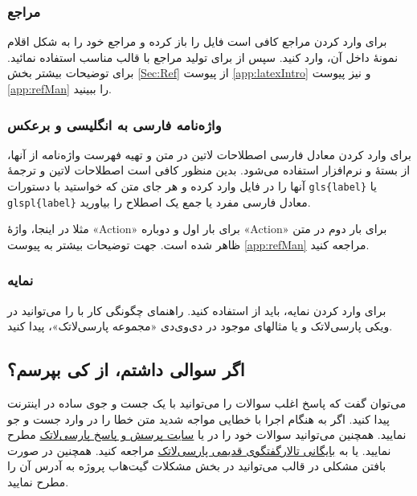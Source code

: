 	\subsubsection{مراجع}
	برای وارد کردن مراجع \پ کافی است فایل 
	را باز کرده و مراجع خود را به شکل اقلام نمونهٔ داخل آن، وارد کنید.  سپس از  برای تولید مراجع با قالب مناسب استفاده نمائید. برای توضیحات بیشتر بخش \ref{Sec:Ref} از پیوست \ref{app:latexIntro} و نیز پیوست \ref{app:refMan} را ببینید.
	
	\subsubsection{واژه‌نامه فارسی به انگلیسی و برعکس}
	برای وارد کردن معادل فارسی اصطلاحات لاتین در متن و تهیه فهرست واژه‌نامه از آنها، از بستهٔ
	و نرم‌افزار
	استفاده می‌شود. بدین منظور کافی است اصطلاحات لاتین و ترجمهٔ آنها را در فایل
	وارد کرده و هر جای متن که خواستید با دستورات
	\verb|gls{label}|
	یا \verb|glspl{label}|
	معادل فارسی مفرد یا جمع یک اصطلاح را بیاورید.
	
	مثلا در اینجا، واژهٔ
	«\gls{Action}»
	برای بار اول و دوباره
	«\gls{Action}»
	برای بار دوم در متن ظاهر شده است.
	جهت توضیحات بیشتر به پیوست
	\ref{app:refMan}
	مراجعه کنید.
	\subsubsection{نمایه}
	برای وارد کردن نمایه، باید از 
	استفاده کنید. 
	راهنمای چگونگی کار با 
	را می‌توانید در ویکی پارسی‌لاتک و یا مثالهای موجود در دی‌وی‌دی «مجموعه پارسی‌لاتک»، پیدا کنید.


\subsection{اگر سوالی داشتم، از کی بپرسم؟}
می‌توان گفت که پاسخ اغلب سوالات را می‌توانید با یک جست و جوی ساده در اینترنت پیدا کنید. اگر به هنگام اجرا با خطایی مواجه شدید متن خطا را در 
وارد جست و جو نمایید. همچنین می‌توانید سوالات خود را در 
یا
\href{http://qa.parsilatex.com}{سایت پرسش و پاسخ پارسی‌لاتک}%
مطرح نمایید.
یا به
\href{http://forum.parsilatex.com}{بایگانی تالارگفتگوی قدیمی پارسی‌لاتک}%
مراجعه کنید.
همچنین در صورت بافتن مشکلی در قالب می‌توانید در بخش مشکلات گیت‌هاب پروژه به آدرس 
آن را مطرح نمایید.

